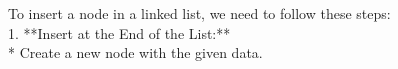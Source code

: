 \documentclass[preview]{standalone}
\begin{document}
To insert a node in a linked list, we need to follow these steps:\\1.  **Insert at the End of the List:**\\*   Create a new node with the given data.\\
\end{document}
